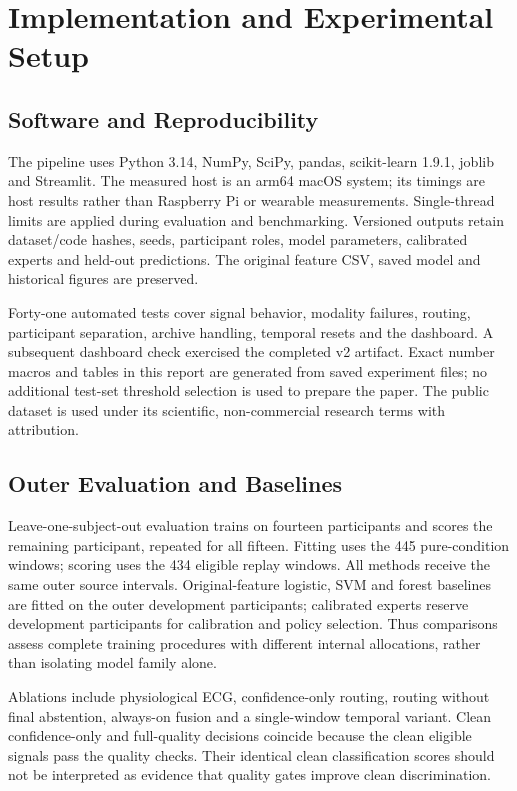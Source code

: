 \documentclass[conference,a4paper]{IEEEtran}
\begin{document}
\section{Implementation and Experimental Setup}
\subsection{Software and Reproducibility}
The pipeline uses Python 3.14, NumPy, SciPy, pandas, scikit-learn 1.9.1, joblib and Streamlit. The measured host is an arm64 macOS system; its timings are host results rather than Raspberry Pi or wearable measurements. Single-thread limits are applied during evaluation and benchmarking. Versioned outputs retain dataset/code hashes, seeds, participant roles, model parameters, calibrated experts and held-out predictions. The original feature CSV, saved model and historical figures are preserved.

Forty-one automated tests cover signal behavior, modality failures, routing, participant separation, archive handling, temporal resets and the dashboard. A subsequent dashboard check exercised the completed v2 artifact. Exact number macros and tables in this report are generated from saved experiment files; no additional test-set threshold selection is used to prepare the paper. The public dataset is used under its scientific, non-commercial research terms with attribution.

\subsection{Outer Evaluation and Baselines}
Leave-one-subject-out evaluation trains on fourteen participants and scores the remaining participant, repeated for all fifteen. Fitting uses the 445 pure-condition windows; scoring uses the 434 eligible replay windows. All methods receive the same outer source intervals. Original-feature logistic, SVM and forest baselines are fitted on the outer development participants; calibrated experts reserve development participants for calibration and policy selection. Thus comparisons assess complete training procedures with different internal allocations, rather than isolating model family alone.

Ablations include physiological ECG, confidence-only routing, routing without final abstention, always-on fusion and a single-window temporal variant. Clean confidence-only and full-quality decisions coincide because the clean eligible signals pass the quality checks. Their identical clean classification scores should not be interpreted as evidence that quality gates improve clean discrimination.
\end{document}
